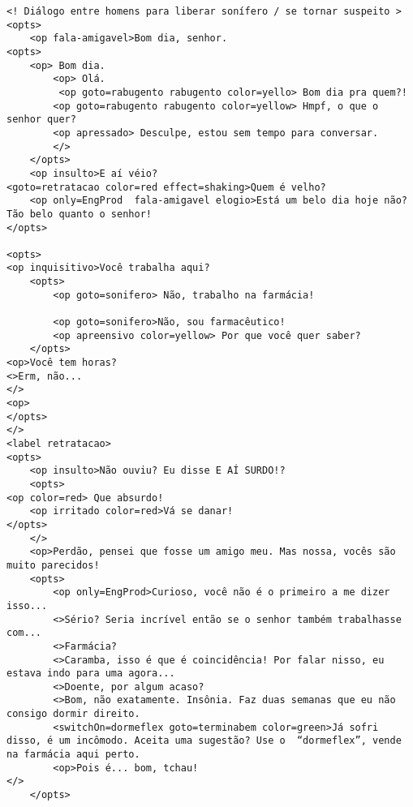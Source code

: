 {\footnotesize
\begin{verbatim}
<! Diálogo entre homens para liberar sonífero / se tornar suspeito >
<opts>
	<op fala-amigavel>Bom dia, senhor.
<opts>
	<op> Bom dia.
		<op> Olá.
		 <op goto=rabugento rabugento color=yello> Bom dia pra quem?!
		<op goto=rabugento rabugento color=yellow> Hmpf, o que o senhor quer?
		<op apressado> Desculpe, estou sem tempo para conversar.
		</>
	</opts>
	<op insulto>E aí véio?
<goto=retratacao color=red effect=shaking>Quem é velho?
	<op only=EngProd  fala-amigavel elogio>Está um belo dia hoje não? Tão belo quanto o senhor!
</opts>

<opts>
<op inquisitivo>Você trabalha aqui?
	<opts>
		<op goto=sonifero> Não, trabalho na farmácia!
		
		<op goto=sonifero>Não, sou farmacêutico!
		<op apreensivo color=yellow> Por que você quer saber?
	</opts>
<op>Você tem horas?
<>Erm, não...
</>
<op>
</opts>
</>
<label retratacao>
<opts>
	<op insulto>Não ouviu? Eu disse E AÍ SURDO!?
	<opts>
<op color=red> Que absurdo!
	<op irritado color=red>Vá se danar!
</opts>
	</>
	<op>Perdão, pensei que fosse um amigo meu. Mas nossa, vocês são muito parecidos!
	<opts>
		<op only=EngProd>Curioso, você não é o primeiro a me dizer isso...
		<>Sério? Seria incrível então se o senhor também trabalhasse com...
		<>Farmácia?
		<>Caramba, isso é que é coincidência! Por falar nisso, eu estava indo para uma agora...
		<>Doente, por algum acaso?
		<>Bom, não exatamente. Insônia. Faz duas semanas que eu não consigo dormir direito.
		<switchOn=dormeflex goto=terminabem color=green>Já sofri disso, é um incômodo. Aceita uma sugestão? Use o  “dormeflex”, vende na farmácia aqui perto.
		<op>Pois é... bom, tchau!
</>
	</opts>


\end{verbatim}}
